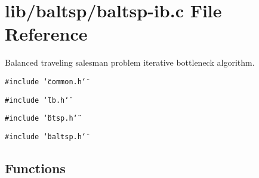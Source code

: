 \hypertarget{lib_2baltsp_2baltsp-ib_8c}{
\section{lib/baltsp/baltsp-ib.c File Reference}
\label{lib_2baltsp_2baltsp-ib_8c}
}
Balanced traveling salesman problem iterative bottleneck algorithm.  


{\tt \#include \char`\"{}common.h\char`\"{}}\par
{\tt \#include \char`\"{}lb.h\char`\"{}}\par
{\tt \#include \char`\"{}btsp.h\char`\"{}}\par
{\tt \#include \char`\"{}baltsp.h\char`\"{}}\par
\subsection*{Functions}
